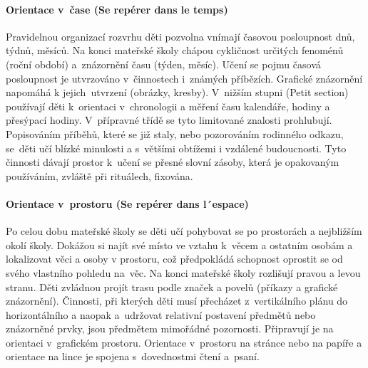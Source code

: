 			\paragraph{Orientace v čase (Se repérer dans le temps)}
				Pravidelnou organizací rozvrhu děti pozvolna vnímají časovou posloupnost dnů, týdnů, měsíců. Na konci mateřské školy chápou cykličnost určitých fenoménů (roční období) a znázornění času (týden, měsíc). Učení se pojmu časová posloupnost je utvrzováno v činnostech i známých příbězích. Grafické znázornění napomáhá k jejich utvrzení (obrázky, kresby).
				V nižším stupni (Petit section) používají děti k orientaci v chronologii a měření času kalendáře, hodiny a přesýpací hodiny. V přípravné třídě se tyto limitované znalosti prohlubují. Popisováním příběhů, které se již staly, nebo pozorováním rodinného odkazu, se děti učí blízké minulosti a s většími obtížemi i vzdálené budoucnosti.
				Tyto činnosti dávají prostor k učení se přesné slovní zásoby, která je opakovaným používáním, zvláště při rituálech, fixována.
			\paragraph{Orientace v prostoru (Se repérer dans l´espace)}
				Po celou dobu mateřské školy se děti učí pohybovat se po prostorách a nejbližším okolí školy. Dokážou si najít své místo ve vztahu k věcem a ostatním osobám a lokalizovat věci a osoby v prostoru, což předpokládá schopnost oprostit se od svého vlastního pohledu na věc. Na konci mateřské školy rozlišují pravou a levou stranu. Děti zvládnou projít trasu podle značek a povelů (příkazy a grafické znázornění).
				Činnosti, při kterých děti musí přecházet z vertikálního plánu do horizontálního a naopak a udržovat relativní postavení předmětů nebo znázorněné prvky, jsou předmětem mimořádné pozornosti. Připravují je na orientaci v grafickém prostoru. Orientace v prostoru na stránce nebo na papíře a orientace na lince je spojena s dovednostmi čtení a psaní. 
